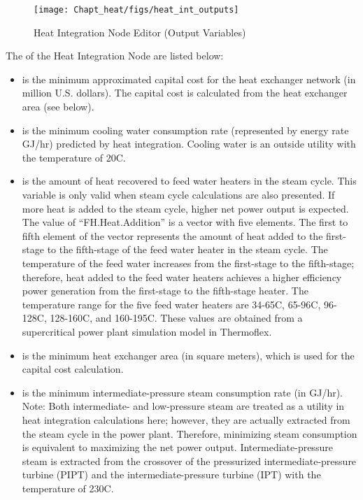 \begin{figure}[H]
	\begin{center}
		\texttt{[image: Chapt\_heat/figs/heat\_int\_outputs]}
		\caption{Heat Integration Node Editor (Output Variables)}
		\label{heat.int.outputs}
	\end{center}
\end{figure}


The  of the Heat Integration Node are listed below:
\begin{itemize}
	\item {} is the minimum approximated capital cost for the heat exchanger network (in million U.S. dollars). The capital cost is calculated from the heat exchanger area (see below).
	\item {} is the minimum cooling water consumption rate (represented by energy rate GJ/hr) predicted by heat integration. Cooling water is an outside utility with the temperature of 20\degree C.
	\item {} is the amount of heat recovered to feed water heaters in the steam cycle. This variable is only valid when steam cycle calculations are also presented. If more heat is added to the steam cycle, higher net power output is expected. The value of ``FH.Heat.Addition'' is a vector with five elements. The first to fifth element of the vector represents the amount of heat added to the first-stage to the fifth-stage of the feed water heater in the steam cycle. The temperature of the feed water increases from the first-stage to the fifth-stage; therefore, heat added to the feed water heaters achieves a higher efficiency power generation from the first-stage to the fifth-stage heater. The temperature range for the five feed water heaters are 34-65\degree C, 65-96\degree C, 96-128\degree C, 128-160\degree C, and 160-195\degree C. These values are obtained from a supercritical power plant simulation model in Thermoflex.
	\item {} is the minimum heat exchanger area (in square meters), which is used for the capital cost calculation.
	\item {} is the minimum intermediate-pressure steam consumption rate (in GJ/hr). Note: Both intermediate- and low-pressure steam are treated as a utility in heat integration calculations here; however, they are actually extracted from the steam cycle in the power plant. Therefore, minimizing steam consumption is equivalent to maximizing the net power output. Intermediate-pressure steam is extracted from the crossover of the pressurized intermediate-pressure turbine (PIPT) and the intermediate-pressure turbine (IPT) with the temperature of 230\degree C.

\end{itemize}
